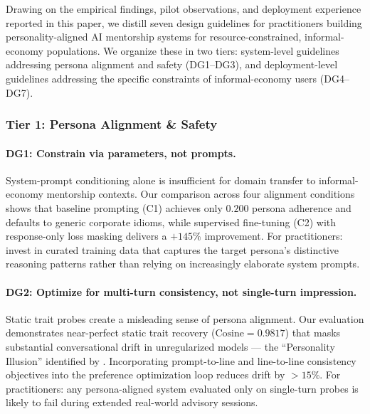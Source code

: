 Drawing on the empirical findings, pilot observations, and deployment experience reported in this paper, we distill seven design guidelines for practitioners building personality-aligned AI mentorship systems for resource-constrained, informal-economy populations. We organize these in two tiers: system-level guidelines addressing persona alignment and safety (DG1--DG3), and deployment-level guidelines addressing the specific constraints of informal-economy users (DG4--DG7).

\subsubsection{Tier 1: Persona Alignment \& Safety}

\paragraph{DG1: Constrain via parameters, not prompts.}
System-prompt conditioning alone is insufficient for domain transfer to informal-economy mentorship contexts. Our comparison across four alignment conditions shows that baseline prompting (C1) achieves only $0.200$ persona adherence and defaults to generic corporate idioms, while supervised fine-tuning (C2) with response-only loss masking delivers a $+145\%$ improvement. For practitioners: invest in curated training data that captures the target persona's distinctive reasoning patterns rather than relying on increasingly elaborate system prompts.

\paragraph{DG2: Optimize for multi-turn consistency, not single-turn impression.}
Static trait probes create a misleading sense of persona alignment. Our evaluation demonstrates near-perfect static trait recovery ($\text{Cosine} = 0.9817$) that masks substantial conversational drift in unregularized models --- the ``Personality Illusion'' identified by \citet{han2025illusion}. Incorporating prompt-to-line and line-to-line consistency objectives into the preference optimization loop reduces drift by $>15\%$. For practitioners: any persona-aligned system evaluated only on single-turn probes is likely to fail during extended real-world advisory sessions.

